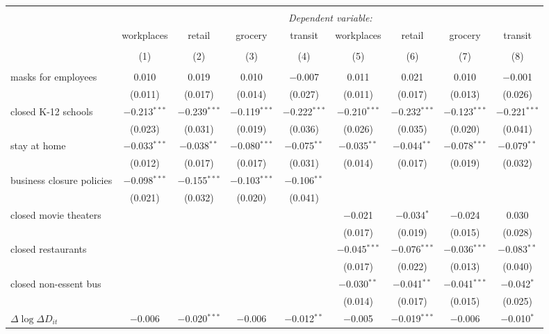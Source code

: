 \begin{tabular}{@{\extracolsep{1pt}}lcccccccc} 
\\[-1.8ex]\hline 
\hline \\[-1.8ex] 
 & \multicolumn{8}{c}{\textit{Dependent variable:}} \\ 
\cline{2-9} 
 & workplaces & retail & grocery & transit & workplaces & retail & grocery & transit \\ 
\\[-1.8ex] & (1) & (2) & (3) & (4) & (5) & (6) & (7) & (8)\\ 
\hline \\[-1.8ex] 
 masks for employees & 0.010 & 0.019 & 0.010 & $-$0.007 & 0.011 & 0.021 & 0.010 & $-$0.001 \\ 
  & (0.011) & (0.017) & (0.014) & (0.027) & (0.011) & (0.017) & (0.013) & (0.026) \\ 
  closed K-12 schools & $-$0.213$^{***}$ & $-$0.239$^{***}$ & $-$0.119$^{***}$ & $-$0.222$^{***}$ & $-$0.210$^{***}$ & $-$0.232$^{***}$ & $-$0.123$^{***}$ & $-$0.221$^{***}$ \\ 
  & (0.023) & (0.031) & (0.019) & (0.036) & (0.026) & (0.035) & (0.020) & (0.041) \\ 
  stay at home & $-$0.033$^{***}$ & $-$0.038$^{**}$ & $-$0.080$^{***}$ & $-$0.075$^{**}$ & $-$0.035$^{**}$ & $-$0.044$^{**}$ & $-$0.078$^{***}$ & $-$0.079$^{**}$ \\ 
  & (0.012) & (0.017) & (0.017) & (0.031) & (0.014) & (0.017) & (0.019) & (0.032) \\ 
  business closure policies & $-$0.098$^{***}$ & $-$0.155$^{***}$ & $-$0.103$^{***}$ & $-$0.106$^{**}$ &  &  &  &  \\ 
  & (0.021) & (0.032) & (0.020) & (0.041) &  &  &  &  \\ 
  closed movie theaters &  &  &  &  & $-$0.021 & $-$0.034$^{*}$ & $-$0.024 & 0.030 \\ 
  &  &  &  &  & (0.017) & (0.019) & (0.015) & (0.028) \\ 
  closed restaurants &  &  &  &  & $-$0.045$^{***}$ & $-$0.076$^{***}$ & $-$0.036$^{***}$ & $-$0.083$^{**}$ \\ 
  &  &  &  &  & (0.017) & (0.022) & (0.013) & (0.040) \\ 
  closed non-essent bus &  &  &  &  & $-$0.030$^{**}$ & $-$0.041$^{**}$ & $-$0.041$^{***}$ & $-$0.042$^{*}$ \\ 
  &  &  &  &  & (0.014) & (0.017) & (0.015) & (0.025) \\ 
  $\Delta \log \Delta D_{it}$ & $-$0.006 & $-$0.020$^{***}$ & $-$0.006 & $-$0.012$^{**}$ & $-$0.005 & $-$0.019$^{***}$ & $-$0.006 & $-$0.010$^{*}$ \\ 

\end{tabular}
